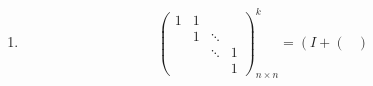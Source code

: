 \documentclass{article}
\begin{document}
\begin{enumerate}
\begin{enumerate}
\[{\begin{pmatrix}
                        0& a& 1& 0\\
                        0& 0& 0& 1\\
                        0& 0& 0& a\\
                        0& 0& 0& 0
                    \end{pmatrix}
                \right)}^{k}
                \xrightarrow
                    {A=\begin{pmatrix}
                        0& a& 1& 0\\
                        0& 0& 0& 1\\
                        0& 0& 0& a\\
                        0& 0& 0& 0
                    \end{pmatrix}}
                {\left(
                    I+A
                \right)}^{k}
                =
                \sum\limits_{i=0}^{k}\binom{k}{i}  A^{k-i}
            \]
            \[
                A^2=
                \begin{pmatrix}
                    0& 0& 0& 2a\\
                    0& 0& 0& 0\\
                    0& 0& 0& 0\\
                    0& 0& 0& 0    
                \end{pmatrix},
                A^3=O
                \Rightarrow
                {\left(
                    I+A
                \right)}^{k}
                =I+kA+\frac{k(k-1)}{2}A^2
                =
                \begin{pmatrix}
                    1& ka& k& k(k-1)a\\
                    0& 1& 0& k\\
                    0& 0& 1& ka\\
                    0& 0& 0& 1
                \end{pmatrix}.
            \]
            \item [(4)]
            \[
                {\begin{pmatrix}
                    1& 1& \ & \ \\
                    \ & 1 & \ddots& \ \\
                    \ & \ & \ddots & 1\\
                    \ & \ & \ & 1
                \end{pmatrix}}_{n\times n}^{k}
                =
                {\left(I+{\begin{pmatrix}

\end{pmatrix}}}\]
\end{enumerate}
\end{enumerate}
\end{document}
